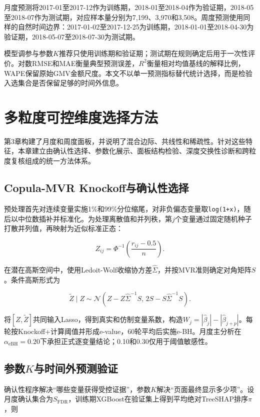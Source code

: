 \documentclass{sufethesismas}
\begin{document}
月度预测将2017-01至2017-12作为训练期，2018-01至2018-04作为验证期，2018-05至2018-07作为测试期，对应样本量分别为7,199、3,970和3,508。周度预测使用同样的自然时间边界：2017-01-02至2017-12-25为训练期，2018-01-01至2018-04-30为验证期，2018-05-07至2018-07-30为测试期。

模型调参与参数\(K\)推荐只使用训练期和验证期；测试期在规则确定后用于一次性评价。对数RMSE和MAE衡量典型预测误差，\(R^2\)衡量相对均值基线的解释比例，WAPE保留原始GMV金额尺度。本文不以单一预测指标替代统计选择，而是检验入选集合是否保留足够的时间外信息。

\chapter{多粒度可控维度选择方法}

第3章构建了月度和周度面板，并说明了混合边际、共线性和稀疏性。针对这些特征，本章建立由确认性选择、参数化展示、面板结构检验、深度交换性诊断和跨粒度复核组成的统一方法体系。

\section{Copula-MVR Knockoff与确认性选择}

预处理首先对连续变量实施1\%和99\%分位缩尾，对非负偏态变量取\texttt{log(1+x)}，随后以中位数插补并标准化。为处理离散值和并列秩，第\(j\)个变量通过固定随机种子打散并列值，再映射为近似标准正态：

\[
Z_{ij}=\Phi^{-1}\left(\frac{r_{ij}-0.5}{n}\right).
\]

在潜在高斯空间中，使用Ledoit-Wolf收缩协方差\(\widehat\Sigma\)，并按MVR准则确定对角矩阵\(S\)。条件高斯形式为

\[
\widetilde Z\mid Z
\sim \mathcal N\left(
Z-Z\widehat\Sigma^{-1}S,\,
2S-S\widehat\Sigma^{-1}S
\right).
\]

将\([Z,\widetilde Z]\)共同输入Lasso，得到真实和仿制变量系数，构造\(W_j=|\widehat\beta_j|-|\widehat\beta_{j+p}|\)。每轮按Knockoff+计算阈值并形成e-value，60轮平均后实施e-BH。月度主分析在\(\alpha_{\mathrm{eBH}}=0.20\)下承担正式逐变量结论；0.10和0.30仅用于阈值敏感性。

\section{\texorpdfstring{参数\(K\)与时间外预测验证}{参数K与时间外预测验证}}

确认性程序解决``哪些变量获得受控证据''，参数\(K\)解决``页面最终显示多少项''。设月度确认集合为\(S_{\mathrm{FDR}}\)，训练期XGBoost在验证集上得到平均绝对TreeSHAP排序\(\pi\)，则
\end{document}
